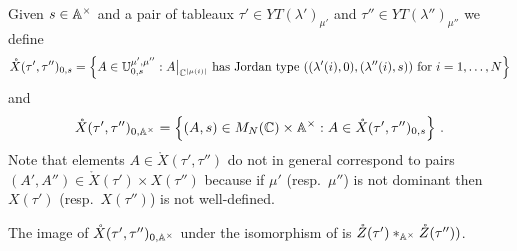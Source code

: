 \documentclass{article} %
\begin{document}
% 
Given $s\in\AA^\times$ and a pair of tableaux $\tau'\in YT(\lambda')_{\mu'}$ and $\tau''\in YT(\lambda'')_{\mu''}$ we define
% 
\begin{equation*}
    \mathring X(\tau',\tau'')_{0,s} 
    = \left\{A\in\UU_{0,s}^{\mu',\mu''} : A \big|_{\CC^{|\mu(i)|}} 
    \text{ has Jordan type } ((\lambda'(i), 0), (\lambda''(i), s))
    \text{ for } i=1,\dots,N\right\}
\end{equation*}
% 
% 
and
\begin{equation*}
        \mathring X(\tau',\tau'')_{0,\AA^\times} = 
    \left\{
        (A,s)\in M_N(\CC) \times \AA^\times: 
        A \in \mathring X(\tau',\tau'')_{0,s} 
    \right\}\,.
\end{equation*}
% 
Note that elements $A\in\mathring X(\tau',\tau'')$ do not in general correspond to pairs $(A',A'')\in\mathring X(\tau')\times X(\tau'')$ because if $\mu'$ (resp.\ $\mu''$) is not dominant then $X(\tau')$ (resp.\ $X(\tau'')$) is not well-defined. 

% 
% 
\begin{proposition}
    \label{pr:XttZtt}
    The image of $\mathring X(\tau',\tau'')_{0,\AA^\times}$ under the isomorphism of  is $\mathring Z(\tau')\ast_\Cx \mathring Z(\tau''))$. 
\end{proposition}
% 
\end{document}
